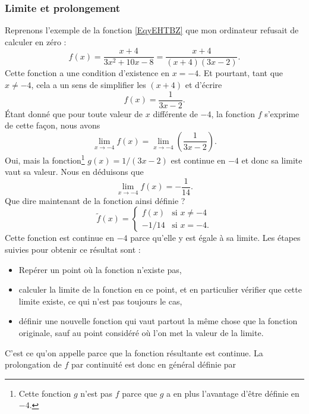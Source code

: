 \subsubsection{Limite et prolongement}

Reprenons l'exemple de la fonction \eqref{EqyEHTBZ} que mon ordinateur refusait de calculer en zéro :
\begin{equation}
	f(x)=\frac{ x+4 }{ 3x^2+10x-8 }=\frac{ x+4 }{ (x+4)(3x-2) }.
\end{equation}
Cette fonction a une condition d'existence en \( x=-4\). Et pourtant, tant que \( x\neq -4\), cela a un sens de simplifier les \( (x+4)\) et d'écrire
\[
	f(x)=\frac{ 1 }{ 3x-2 }.
\]
Étant donné que pour toute valeur de \( x\) différente de \( -4\), la fonction \( f\) s'exprime de cette façon, nous avons
\[
	\lim_{x\to -4}f(x)=\lim_{x\to -4}\left(\frac{ 1 }{ 3x-2 }\right).
\]
Oui, mais la fonction\footnote{Cette fonction \( g\) n'est pas \( f\) parce que \( g\) a en plus l'avantage d'être définie en \( -4\).} \( g(x)=1/(3x-2)\) est continue en \( -4\) et donc sa limite vaut sa valeur. Nous en déduisons que
\[
	\lim_{x\to -4}f(x)=-\frac{ 1 }{ 14 }.
\]
Que dire maintenant de la fonction ainsi définie ?
\begin{equation}
	\tilde f(x)=
	\begin{cases}
		f(x)  & \text{si }x\neq -4 \\
		-1/14 & \text{si }x=-4.
	\end{cases}
\end{equation}
Cette fonction est continue en \( -4\) parce qu'elle y est égale à sa limite. Les étapes suivies pour obtenir ce résultat sont :
\begin{itemize}
	\item Repérer un point où la fonction n'existe pas,
	\item calculer la limite de la fonction en ce point, et en particulier vérifier que cette limite existe, ce qui n'est pas toujours le cas,
	\item définir une nouvelle fonction qui vaut partout la même chose que la fonction originale, sauf au point considéré où l'on met la valeur de la limite.
\end{itemize}
C'est ce qu'on appelle  parce que la fonction résultante est continue. La prolongation de \( f\) par continuité est donc en général définie par
